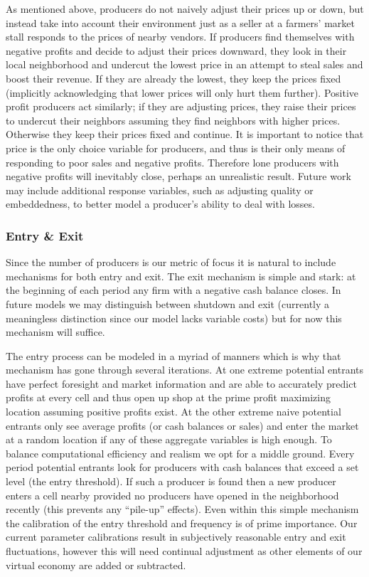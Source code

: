 \documentclass[11pt, oneside]{article}
\begin{document}
As mentioned above, producers do not naively adjust their prices up or down, but instead take into account their environment just as a seller at a farmers' market stall responds to the prices of nearby vendors. If producers find themselves with negative profits and decide to adjust their prices downward, they look in their local neighborhood and undercut the lowest price in an attempt to steal sales and boost their revenue. If they are already the lowest, they keep the prices fixed (implicitly acknowledging that lower prices will only hurt them further). Positive profit producers act similarly; if they are adjusting prices, they raise their prices to undercut their neighbors assuming they find neighbors with higher prices. Otherwise they keep their prices fixed and continue. It is important to notice that price is the only choice variable for producers, and thus is their only means of responding to poor sales and negative profits. Therefore lone producers with negative profits will inevitably close, perhaps an unrealistic result. Future work may include additional response variables, such as adjusting quality or embeddedness, to better model a producer's ability to deal with losses.

\subsubsection{Entry \& Exit}
Since the number of producers is our metric of focus it is natural to include mechanisms for both entry and exit. The exit mechanism is simple and stark: at the beginning of each period any firm with a negative cash balance closes. In future models we may distinguish between shutdown and exit (currently a meaningless distinction since our model lacks variable costs) but for now this mechanism will suffice.

The entry process can be modeled in a myriad of manners which is why that mechanism has gone through several iterations. At one extreme potential entrants have perfect foresight and market information and are able to accurately predict profits at every cell and thus open up shop at the prime profit maximizing location assuming positive profits exist. At the other extreme naive potential entrants only see average profits (or cash balances or sales) and enter the market at a random location if any of these aggregate variables is high enough. To balance computational efficiency and realism we opt for a middle ground. Every period potential entrants look for producers with cash balances that exceed a set level (the entry threshold). If such a producer is found then a new producer enters a cell nearby provided no producers have opened in the neighborhood recently (this prevents any ``pile-up'' effects). Even within this simple mechanism the calibration of the entry threshold and frequency is of prime importance. Our current parameter calibrations result in subjectively reasonable entry and exit fluctuations, however this will need continual adjustment as other elements of our virtual economy are added or subtracted.
\end{document}
